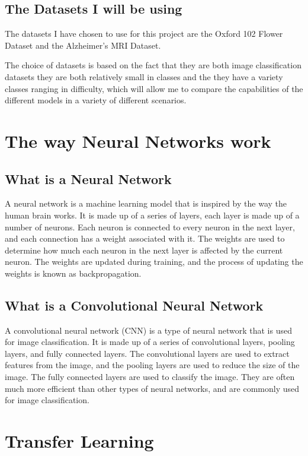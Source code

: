\documentclass[]{final_report}
\begin{document}
\section{The Datasets I will be using}
The datasets I have chosen to use for this project are the Oxford 102 Flower Dataset\cite{OxfordFlowers102} and the Alzheimer's MRI Dataset\cite{AlzheimersDataset}.

The choice of datasets is based on the fact that they are both image classification datasets they are both relatively small in classes and
the they have a variety classes ranging in difficulty, which will allow me to compare the capabilities of the different models in a variety of different scenarios.



\chapter{The way Neural Networks work}

\section{What is a Neural Network}
A neural network is a machine learning model that is inspired by the way the human brain works.
It is made up of a series of layers, each layer is made up of a number of neurons.
Each neuron is connected to every neuron in the next layer, and each connection has a weight associated with it.
The weights are used to determine how much each neuron in the next layer is affected by the current neuron.
The weights are updated during training, and the process of updating the weights is known as backpropagation.

\section{What is a Convolutional Neural Network}
A convolutional neural network (CNN) is a type of neural network that is used for image classification.
It is made up of a series of convolutional layers, pooling layers, and fully connected layers.
The convolutional layers are used to extract features from the image, and the pooling layers are used to reduce the size of the image.
The fully connected layers are used to classify the image.
They are often much more efficient than other types of neural networks, and are commonly used for image classification.

\chapter{Transfer Learning}
\end{document}
